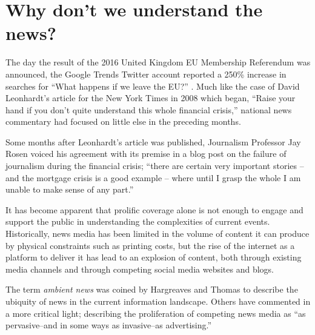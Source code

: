 \section{Why don't we understand the news?}

The day the result of the 2016 United Kingdom EU Membership Referendum was announced, the Google Trends Twitter account reported a 250\% increase in searches for ``What happens if we leave the EU?'' \citep{googletrends}. Much like the case of David Leonhardt's article for the New York Times in 2008 which began, ``Raise your hand if you don't quite understand this whole financial crisis,'' national news commentary had focused on little else in the preceding months.

Some months after Leonhardt's article was published, Journalism Professor Jay Rosen voiced his agreement with its premise in a blog post on the failure of journalism during the financial crisis; ``there are certain very important stories -- and the mortgage crisis is a good example -- where until I grasp the whole I am unable to make sense of any part.''\citep{NationalExplainer} 

It has become apparent that prolific coverage alone is not enough to engage and support the public in understanding the complexities of current events. Historically, news media has been limited in the volume of content it can produce by physical constraints such as printing costs, but the rise of the internet as a platform to deliver it has lead to an explosion of content, both through existing media channels and through competing social media websites and blogs. 

The term \textit{ambient news} was coined by Hargreaves and Thomas \citep{newnewsoldnews} to describe the ubiquity of news in the current information landscape. Others have commented in a more critical light; describing the proliferation of competing news media as ``as pervasive--and in some ways as invasive--as advertising.'' \citep[p.2]{overloadjournalismsbattle}


